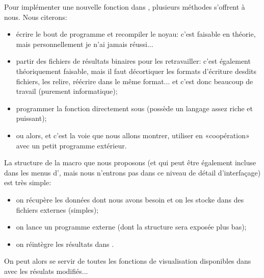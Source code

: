 \medskip
Pour implémenter une nouvelle fonction dans \ansys, plusieurs méthodes s'offrent à nous. Nous citerons:
\begin{itemize}
  \item écrire le bout de programme et recompiler le noyau: c'est faisable en théorie, mais personnellement je n'ai
	jamais réussi...
  \item partir des fichiers de résultats binaires pour les retravailler: c'est également théoriquement faisable, mais
	il faut décortiquer les formats d'écriture desdits fichiers, les relire, réécrire dans le même format...
	et c'est donc beaucoup de travail (purement informatique);
  \item programmer la fonction directement sous \ansys (\ansys possède un langage assez riche et puissant);
  \item ou alors, et c'est la voie que nous allons montrer, utiliser \ansys en «coopération» avec un
	petit programme extérieur.
\end{itemize}

\medskip
La structure de la macro \ansys que nous proposons (et qui peut être également incluse dans les menus d'\ansys, mais
nous n'entrons pas dans ce niveau de détail d'interfaçage) est très simple:
\begin{itemize}
  \item on récupère les données dont nous avons besoin et on les stocke dans des fichiers externes (simples);
  \item on lance un programme externe (dont la structure sera exposée plus bas);
  \item on réintègre les résultats dans \ansys.
\end{itemize}
On peut alors se servir de toutes les fonctions de visualisation disponibles dans \ansys avec les résulats modifiés...

